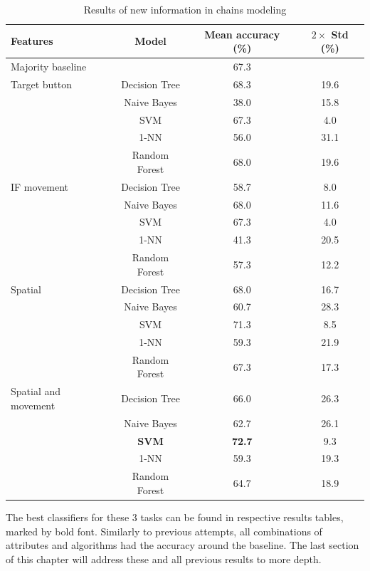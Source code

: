 \begin{table}[!htbp]
 \centering
\begin{tabular}{lccc}
\toprule
Features & Model    & Mean accuracy (\%) &  $2\times$ Std (\%) \\
\midrule
 Majority baseline  &   & 67.3	& \\
\midrule
Target button 	& Decision Tree 	& 68.3	& 19.6 	\\
				& Naive Bayes  	& 38.0	& 15.8	\\
				& SVM 			& 67.3	& 4.0 	\\
				& 1-NN			& 56.0	& 31.1 	\\
				& Random Forest	& 68.0	& 19.6	\\
\midrule
IF movement	& Decision Tree 	& 	58.7	& 8.0 \\
			& Naive Bayes  	&	68.0	& 11.6	\\
			& SVM 			&	67.3	& 4.0 	\\
			& 1-NN			&	41.3	& 20.5 	\\
			& Random Forest	&	57.3& 12.2 	\\
			
\midrule
Spatial	 	& Decision Tree 	& 68.0	& 16.7 \\
			& Naive Bayes  	& 60.7 	& 28.3	\\
			& SVM 			& 71.3	& 8.5 	\\
			& 1-NN			& 59.3	& 21.9 \\
			& Random Forest	& 67.3	& 17.3 \\	

\midrule
Spatial and movement& Decision Tree 	& 66.0	& 26.3 \\
					& Naive Bayes  	& 62.7	& 26.1	\\
					& \textbf{SVM} 	& \textbf{72.7}	& 9.3 	\\
					& 1-NN			& 59.3	& 19.3 \\
					& Random Forest	& 64.7	& 18.9 \\	 	
\bottomrule
\end{tabular}
\caption{Results of new information in chains modeling}
\label{tab:chains-ml-infgain}
\end{table}

The best classifiers for these 3 tasks can be found in respective results tables, marked by bold font. Similarly to previous attempts, all combinations of attributes and algorithms had the accuracy around the baseline. The last section of this chapter will address these and all previous results to more depth.

